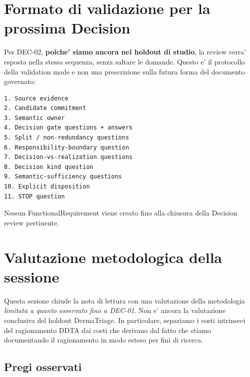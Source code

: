 \documentclass[11pt,a4paper]{article}
\begin{document}
\section{Formato di validazione per la prossima Decision}

Per DEC-02, \textbf{poiche' siamo ancora nel holdout di studio}, la review verra' esposta nella stessa sequenza, senza saltare le domande. Questo e' il protocollo della validation mode e non una prescrizione sulla futura forma del documento governato:

\begin{lstlisting}
1. Source evidence
2. Candidate commitment
3. Semantic owner
4. Decision gate questions + answers
5. Split / non-redundancy questions
6. Responsibility-boundary question
7. Decision-vs-realization questions
8. Decision kind question
9. Semantic-sufficiency questions
10. Explicit disposition
11. STOP question
\end{lstlisting}

Nessun FunctionalRequirement viene creato fino alla chiusura della Decision review pertinente.

\section{Valutazione metodologica della sessione}

Questa sezione chiude la nota di lettura con una valutazione della metodologia \emph{limitata a quanto osservato fino a DEC-01}. Non e' ancora la valutazione conclusiva del holdout DermaTriage. In particolare, separiamo i costi intrinseci del ragionamento DDTA dai costi che derivano dal fatto che stiamo documentando il ragionamento in modo esteso per fini di ricerca.

\subsection{Pregi osservati}
\end{document}

